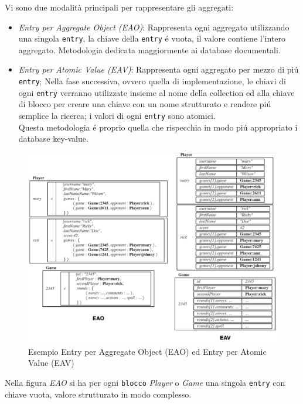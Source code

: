 Vi sono due modalità principali per rappresentare gli aggregati:
\begin{itemize}
    \item \emph{Entry per Aggregate Object (EAO)}: Rappresenta ogni aggregato utilizzando una singola
    \texttt{entry}, la chiave della \texttt{entry} é vuota, il valore contiene l'intero aggregato.
    Metodologia dedicata maggiormente ai database documentali.
    \item \emph{Entry per Atomic Value (EAV)}: Rappresenta ogni aggregato per mezzo di piú \texttt{entry};
    Nella fase successiva, ovvero quella di implementazione, le chiavi di ogni \texttt{entry} verranno utilizzate
    insieme al nome della collection ed alla chiave di blocco per creare una chiave con un
    nome strutturato e rendere piú semplice la ricerca;
    i valori di ogni \texttt{entry} sono atomici.\\
    Questa metodologia é proprio quella che rispecchia in modo piú appropriato i database key-value.
\end{itemize}
\vspace{0.5cm}
\begin{figure}[H]
    \begin{center}
        \includegraphics[width=1\textwidth]{img/eao.eav}
    \end{center}
    \caption{Esempio Entry per Aggregate Object (EAO) ed Entry per Atomic Value (EAV)}
\end{figure}
Nella figura \emph{EAO} si ha per ogni \texttt{blocco} \emph{Player} o \emph{Game} una singola \texttt{entry} con chiave vuota,
valore strutturato in modo complesso.
